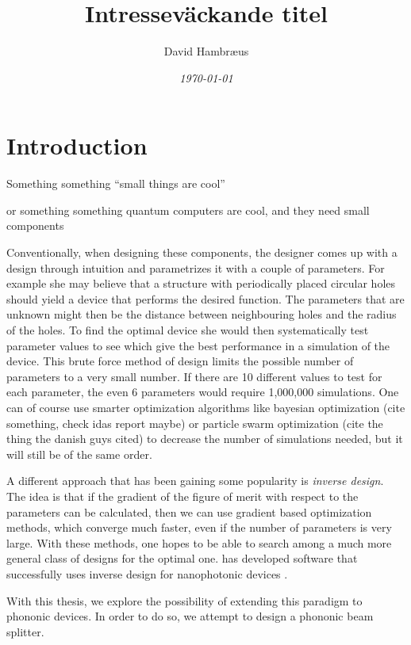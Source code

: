 \documentclass[11pt]{article}
\title{Intresseväckande titel}
\author{David Hambr\ae us}
\date{\textit{\today}}
\begin{document}
\maketitle

\tableofcontents

\printglossaries{}

\section{Introduction}

Something something ``small things are cool''

or something something quantum computers are cool, and they need small
components

Conventionally, when designing these components, the designer comes up with a
design through intuition and parametrizes it with a couple of parameters.
For example she may believe that a structure with periodically placed circular
holes should yield a device that performs the desired function.
The parameters that are unknown might then be the distance between neighbouring
holes and the radius of the holes.
To find the optimal device she would then systematically test parameter values
to see which give the best performance in a simulation of the device.
This brute force method of design limits the possible number of parameters to a
very small number.
If there are 10 different values to test for each parameter, the even 6
parameters would require 1,000,000 simulations.
One can of course use smarter optimization algorithms like bayesian optimization
(cite something, check idas report maybe) or particle swarm optimization (cite the thing the danish guys
cited)
to decrease the number of simulations needed, but it will still be of the same
order.

A different approach that has been gaining some popularity is
\emph{inverse design}. The idea is that if the gradient of the figure of merit
with respect to the parameters can be calculated, then we can use gradient based
optimization methods, which converge much faster, even if the number of
parameters is very large. With these methods, one hopes to be able to search
among a much more general class of designs for the optimal one.
\citeauthor{spins2019} has developed software that successfully uses inverse design for
nanophotonic devices \cite{spins2019}.

With this thesis, we explore the possibility of extending this paradigm to
phononic devices. In order to do so, we attempt to design a phononic beam
splitter.
\end{document}
